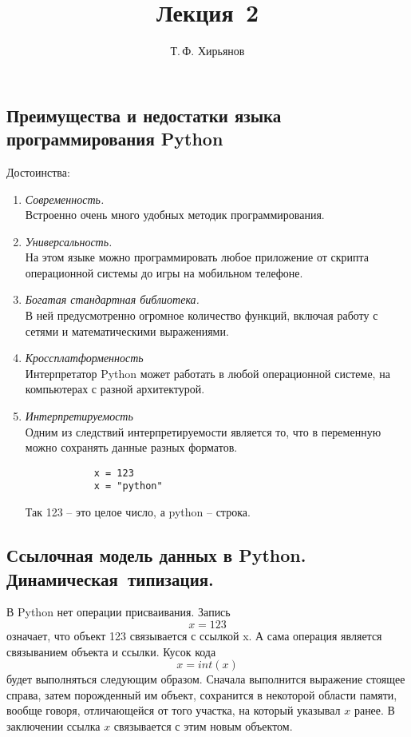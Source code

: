 \documentclass[a4paper, fleqn]{article}
\title{Лекция \textnumero\,2}
\author{Т.\,Ф. Хирьянов}
\date{}
\begin{document}
	\maketitle
	\subsection*{Преимущества и недостатки языка программирования Python}
		Достоинства:
		\begin{enumerate}
			\item \emph{Современность.}\\
			Встроенно очень много удобных методик программирования.
			
			\item \emph{Универсальность.}\\			
			На этом языке можно программировать любое приложение от скрипта операционной системы до игры на мобильном телефоне.
			
			\item \emph{Богатая стандартная библиотека.}\\			
			В ней предусмотренно огромное количество функций, включая работу с сетями и математическими выражениями.
			
			\item \emph{Кроссплатформенность}\\			
			Интерпретатор Python может работать в любой операционной системе, на компьютерах с разной архитектурой.
			
			\item \emph{Интерпретируемость}\\			
			Одним из следствий интерпретируемости является то, что в переменную можно сохранять данные разных форматов. 
			\begin{lstlisting}
			x = 123		
			x = "python" 	
			\end{lstlisting}
			Так 123 -- это целое число, а python -- строка.
		\end{enumerate}
		
	\subsection* {Ссылочная модель данных в Python. Динамическая~типизация.}
	
		В Python нет операции присваивания. Запись
		\[x = 123\]
		означает, что объект 123 связывается с ссылкой x. А сама операция является связыванием объекта и ссылки.
		Кусок кода
		\[x = int(x)\]
		будет выполняться следующим образом. Сначала выполнится выражение стоящее справа, затем порожденный им объект, сохранится в некоторой области памяти, вообще говоря, отличающейся от того участка, на который указывал $x$ ранее. В заключении ссылка $x$ связывается с этим новым объектом.
		
\end{document}
